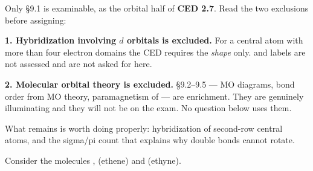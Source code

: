 \documentclass{apchem-exam}
\begin{document}
\apctitleblock

\begin{apcnote}
Only \S9.1 is examinable, as the orbital half of \textbf{CED 2.7}. Read
the two exclusions before assigning:

\textbf{1. Hybridization involving $d$ orbitals is excluded.} For a
central atom with more than four electron domains the CED requires the
\emph{shape} only.  and  labels are not assessed and
are not asked for here.

\textbf{2. Molecular orbital theory is excluded.} \S9.2--9.5 --- MO
diagrams, bond order from MO theory, paramagnetism of  --- are
enrichment. They are genuinely illuminating and they will not be on the
exam. No question below uses them.

What remains is worth doing properly: hybridization of second-row central
atoms, and the sigma/pi count that explains why double bonds cannot
rotate.
\end{apcnote}



Consider the molecules ,  (ethene) and 
(ethyne).
\end{document}
